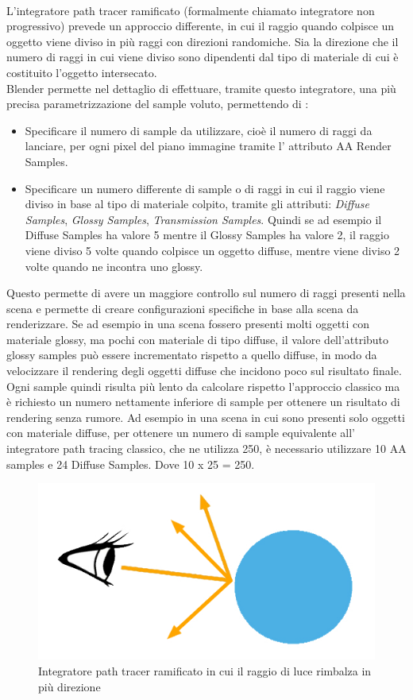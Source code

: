 \\
L’integratore path tracer ramificato (formalmente chiamato integratore non progressivo) prevede un approccio differente, in cui il raggio quando colpisce un oggetto  viene diviso in più raggi con direzioni randomiche. Sia la direzione che il numero di raggi in cui viene diviso sono dipendenti dal tipo di materiale di cui è costituito l’oggetto intersecato.
\\
Blender permette nel dettaglio di effettuare, tramite questo integratore, una più precisa parametrizzazione del sample voluto, permettendo di :
\begin{itemize}
\item Specificare il numero di sample da utilizzare, cioè il numero di raggi da lanciare, per ogni pixel del piano immagine tramite l’ attributo AA Render Samples.
\item Specificare un numero differente di sample o di raggi in cui il raggio viene diviso in base al tipo di materiale colpito, tramite gli attributi: \emph{Diffuse Samples}, \emph{Glossy Samples}, \emph{Transmission Samples}. Quindi se ad esempio il Diffuse Samples ha valore 5 mentre il Glossy Samples ha valore 2, il raggio viene diviso 5 volte quando colpisce un oggetto diffuse, mentre viene diviso 2 volte quando ne incontra uno glossy.
\end{itemize}
Questo permette di avere un maggiore controllo sul numero di raggi presenti nella scena e permette di creare configurazioni specifiche in base alla scena da renderizzare.
Se ad esempio in una scena fossero presenti molti oggetti con materiale glossy, ma pochi con materiale di tipo diffuse, il valore dell’attributo glossy samples può essere incrementato rispetto a quello diffuse, in modo da velocizzare il rendering degli oggetti diffuse che incidono poco sul risultato finale.
\\
Ogni sample quindi risulta più lento da calcolare rispetto l’approccio classico ma è richiesto un numero nettamente inferiore di sample per ottenere un risultato di rendering senza rumore.
Ad esempio in una scena in cui sono presenti solo oggetti con materiale diffuse, per ottenere un numero di sample equivalente all’ integratore path tracing classico, che ne utilizza 250, è necessario utilizzare 10 AA samples e 24 Diffuse Samples. Dove 10 x 25 = 250.
\begin{figure}[htb]
 \centering
 \includegraphics[width=0.6\linewidth]{images/chapter_tecnologie_abilitanti/tecnologie_abilitanti_sferaluce2.jpg}\hfill
 \caption[Integratore path tracer ramificato]{Integratore path tracer ramificato in cui il raggio di luce rimbalza in più direzione}
 \label{fig:tecnologie_abilitanti_sferaluce2}
\end{figure}

